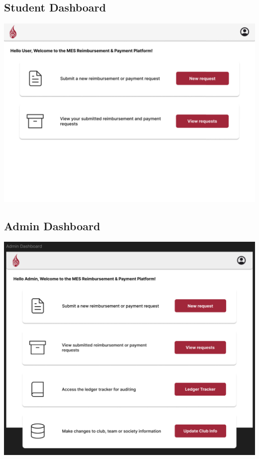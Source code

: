 \documentclass[12pt, titlepage]{article}
\begin{document}
\subsection{Student Dashboard}
\includegraphics[]{imgs/StudentDashboard.png}

\subsection{Admin Dashboard}
\includegraphics[]{imgs/AdminDashboard.png}
\end{document}
